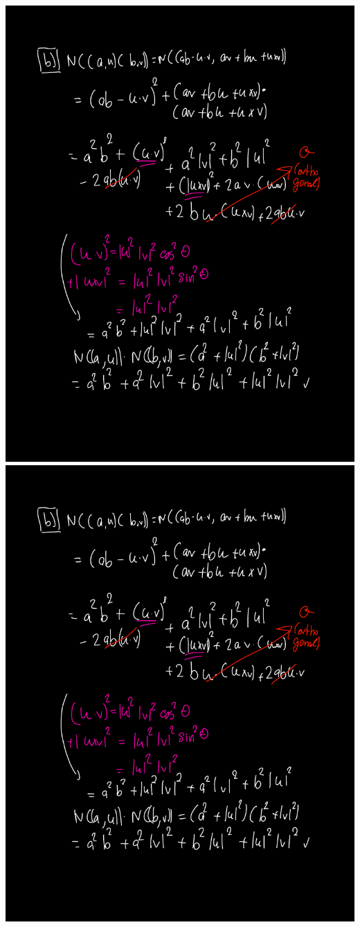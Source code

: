 \documentclass[12pt]{article}
\theoremstyle{definitionstyle}
\begin{document}
		\includegraphics[scale=0.75,page=2]{q5.pdf}
		\newpage
		\includegraphics[scale=0.75,page=3]{q5.pdf}
\end{document}
